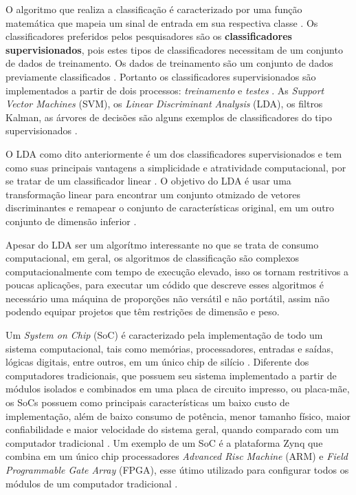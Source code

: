 O algoritmo que realiza a classificação é caracterizado por uma função matemática
que mapeia um sinal de entrada em sua respectiva classe \cite{lottephd}. Os classificadores
preferidos pelos pesquisadores são os \textbf{classificadores supervisionados}, pois estes
tipos de classificadores necessitam de um conjunto de dados de treinamento. Os dados de treinamento são um conjunto de dados previamente classificados \cite{Siulybook}. Portanto os classificadores supervisionados são implementados a partir de dois processos: \textit{treinamento} e \textit{testes} \cite{Siulybook}. As \textit{Support Vector Machines} (SVM), os \textit{Linear Discriminant Analysis} (LDA), os filtros Kalman, as árvores de decisões são alguns exemplos de classificadores do tipo supervisionados \cite{Siulybook}.

O LDA como dito anteriormente é um dos classificadores supervisionados e tem como suas principais vantagens
a simplicidade e atratividade computacional, por se tratar de um classificador linear \cite{patternRecogn}.
O objetivo do LDA é usar uma transformação linear para encontrar um conjunto otmizado de vetores
discriminantes e remapear o conjunto de características
original, em um outro conjunto de dimensão  inferior \cite{ShashoaLDA}.

Apesar do LDA ser um algorítmo interessante no que se trata de consumo computacional, em geral, os algoritmos de classificação são complexos computacionalmente com tempo de execução elevado,
isso os tornam restritivos a poucas aplicações, para executar um 
códido que descreve esses algoritmos é necessário uma máquina de proporções não versátil e não portátil,
assim não podendo equipar projetos que têm restrições de dimensão e peso.

Um \textit{System on Chip} (SoC) é caracterizado pela implementação de todo um sistema computacional, tais como memórias, processadores, entradas e saídas, lógicas digitais, entre outros, em um único chip de silício \cite{zynqBook}. Diferente dos computadores tradicionais, que possuem seu sistema implementado a partir de módulos isolados e combinados em uma placa de circuito impresso, ou placa-mãe, os SoCs possuem como principais características um baixo custo de implementação, além de baixo consumo de potência, menor tamanho físico, maior confiabilidade e maior velocidade do sistema geral, quando comparado com um computador tradicional \cite{zynqBook}. Um exemplo de um SoC é a plataforma Zynq que combina em um único chip processadores \textit{Advanced Risc Machine} (ARM) e \textit{Field Programmable Gate Array} (FPGA), esse útimo utilizado para configurar todos os módulos de um computador tradicional \cite{zynqBook}. 

